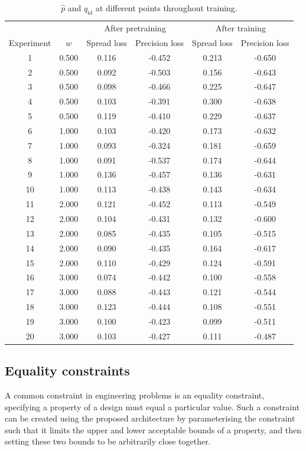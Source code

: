 \documentclass[../../main.tex]{subfiles}
\begin{document}
\begin{table}[H]
    \centering
    \begin{tabular}{*6c}
    \toprule
    {} & {} & \multicolumn{2}{c}{After pretraining} & \multicolumn{2}{c}{After training}\\
    Experiment&$w$&Spread loss&Precision loss&Spread loss&Precision loss\\
    \midrule
    1&0.500&0.116&-0.452&0.213&-0.650\\2&0.500&0.092&-0.503&0.156&-0.643\\3&0.500&0.098&-0.466&0.225&-0.647\\4&0.500&0.103&-0.391&0.300&-0.638\\5&0.500&0.119&-0.410&0.229&-0.637\\6&1.000&0.103&-0.420&0.173&-0.632\\7&1.000&0.093&-0.324&0.181&-0.659\\8&1.000&0.091&-0.537&0.174&-0.644\\9&1.000&0.136&-0.457&0.136&-0.631\\10&1.000&0.113&-0.438&0.143&-0.634\\11&2.000&0.121&-0.452&0.113&-0.549\\12&2.000&0.104&-0.431&0.132&-0.600\\13&2.000&0.085&-0.435&0.105&-0.515\\14&2.000&0.090&-0.435&0.164&-0.617\\15&2.000&0.110&-0.429&0.124&-0.591\\16&3.000&0.074&-0.442&0.100&-0.558\\
    17&3.000&0.088&-0.443&0.121&-0.544\\18&3.000&0.123&-0.444&0.108&-0.551\\19&3.000&0.100&-0.423&0.099&-0.511\\20&3.000&0.103&-0.427&0.111&-0.487\\
    \bottomrule
    \end{tabular}
    \caption{$\hat{p}$ and $q_\text{id}$ at different points throughout training.}
    \label{table:generatorTrainingProgression}
\end{table}

\subsection{Equality constraints} \label{subsection:equalityConstraints}

A common constraint in engineering problems is an equality constraint, specifying a property of a design must equal a particular value.
Such a constraint can be created using the proposed architecture by parameterising the constraint such that it limits the upper and lower acceptable bounds of a property, and then setting these two bounds to be arbitrarily close together.
\end{document}
